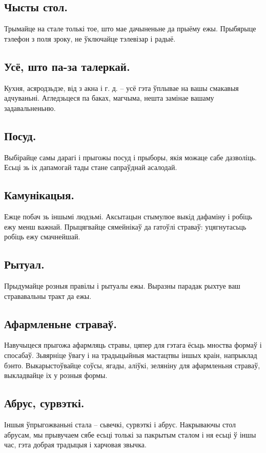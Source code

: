 \subsection{Чысты стол.}
Трымайце на стале толькі тое, што мае дачыненьне да прыёму ежы. Прыбярыце тэлефон з поля зроку, не ўключайце тэлевізар і радыё.

\subsection{Усё, што па-за талеркай.}
Кухня, асяродзьдзе, від з акна і г. д. – усё гэта ўплывае на вашы смакавыя адчуваньні. Агледзьцеся па баках, магчыма, нешта замінае вашаму задавальненьню.

\subsection{Посуд.}
Выбірайце самы дарагі і прыгожы посуд і прыборы, якія можаце сабе дазволіць. Есьці зь іх дапамогай тады стане сапраўднай асалодай.

\subsection{Камунікацыя.}
Ежце побач зь іншымі людзьмі. Аксытацын стымулюе выкід дафаміну і робіць ежу менш важнай. Прыцягвайце сямейнікаў да гатоўлі страваў: уцягнутасьць робіць ежу смачнейшай.

\subsection{Рытуал.}
Прыдумайце розныя правілы і рытуалы ежы. Выразны парадак рыхтуе ваш стрававальны тракт да ежы.

\subsection{Афармленьне страваў.}
Навучыцеся прыгожа афармляць стравы, цяпер для гэтага ёсьць мноства формаў і спосабаў. Зьвярніце ўвагу і на традыцыйныя мастацтвы іншых краін, напрыклад бэнто. Выкарыстоўвайце соўсы, ягады, аліўкі, зеляніну для афармленьня страваў, выкладвайце іх у розныя формы.

\subsection{Абрус, сурвэткі.}
Іншыя ўпрыгожваньні стала – сьвечкі, сурвэткі і абрус. Накрываючы стол абрусам, мы прывучаем сябе есьці толькі за пакрытым сталом і ня есьці ў іншы час, гэта добрая традыцыя і харчовая звычка.

